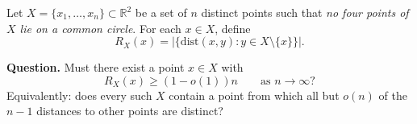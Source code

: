 Let $X=\{x_1,\dots,x_n\}\subset\mathbb{R}^2$ be a set of $n$ distinct points such that \emph{no four points of $X$ lie on a common circle}.
For each $x\in X$, define
\[
R_X(x)=\left\lvert \{\mathrm{dist}(x,y):y\in X\setminus\{x\}\} \right\rvert.
\]

\medskip
\noindent
\textbf{Question.}
Must there exist a point $x\in X$ with
\[
R_X(x)\ge (1-o(1))n\qquad\text{as }n\to\infty?
\]
Equivalently: does every such $X$ contain a point from which all but $o(n)$ of the $n-1$ distances to other points are distinct?
